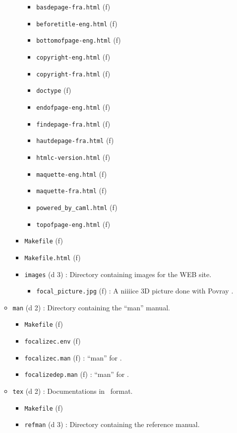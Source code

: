 \begin{itemize}
\begin{itemize}
\begin{itemize}
\begin{itemize}
      \item {\tt basdepage-fra.html} (f)
      \item {\tt beforetitle-eng.html} (f)
      \item {\tt bottomofpage-eng.html} (f)
      \item {\tt copyright-eng.html} (f)
      \item {\tt copyright-fra.html} (f)
      \item {\tt doctype} (f)
      \item {\tt endofpage-eng.html} (f)
      \item {\tt findepage-fra.html} (f)
      \item {\tt hautdepage-fra.html} (f)
      \item {\tt htmlc-version.html} (f)
      \item {\tt maquette-eng.html} (f)
      \item {\tt maquette-fra.html} (f)
      \item {\tt powered\_by\_caml.html} (f)
      \item {\tt topofpage-eng.html} (f)
      \end{itemize}
    \item {\tt Makefile} (f)
    \item {\tt Makefile.html} (f)
    \item {\tt images} (d 3) : Directory containing images for the WEB
      site.
      \begin{itemize}
      \item {\tt focal\_picture.jpg} (f) : A niiiice 3D picture done with
        Povray \smiley.
      \end{itemize}
    \end{itemize}
  \item {\tt man} (d 2) : Directory containing the ``man'' manual.
    \begin{itemize}
    \item {\tt Makefile} (f)
    \item {\tt focalizec.env} (f)
    \item {\tt focalizec.man} (f) : ``man'' for \focalizec.
    \item {\tt focalizedep.man} (f) : ``man'' for \focalizedep.
    \end{itemize}
  \item {\tt  tex} (d 2) : Documentations in \latex\ format.
    \begin{itemize}
    \item {\tt Makefile} (f)
    \item {\tt refman} (d 3) : Directory containing the reference manual.

\end{itemize}
\end{itemize}
\end{itemize}
